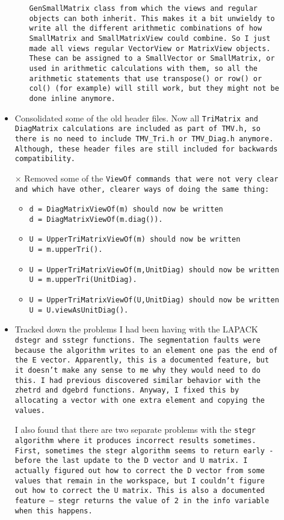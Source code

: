 \begin{description}
\begin{itemize}
\begin{itemize}
\tt{GenSmallMatrix} class from which the views and regular objects can both inherit.  This
makes it a bit unwieldy to write all the different arithmetic combinations of how 
\tt{SmallMatrix} and \tt{SmallMatrixView} could combine.  So I just made all views
regular \tt{VectorView} or \tt{MatrixView} objects.  These can be assigned to a \tt{SmallVector}
or \tt{SmallMatrix}, or used in arithmetic calculations with them, so all the arithmetic statements
that use \tt{transpose()} or \tt{row()} or \tt{col()} (for example) will still work, but they might
not be done inline anymore.
\end{itemize}
\item
Consolidated some of the old header files.  Now all \tt{TriMatrix} and \tt{DiagMatrix}
calculations are included as part of \tt{TMV.h}, so there is no need to include \tt{TMV\_Tri.h}
or \tt{TMV\_Diag.h} anymore.  Although, these header files are still included for backwards
compatibility.
\item[$\times$]
Removed some of the \tt{ViewOf} commands that were not very clear and
which have other, clearer ways of doing the same thing:
\begin{itemize}
\item
\tt{d = DiagMatrixViewOf(m)} should now be written\\
\tt{d = DiagMatrixViewOf(m.diag())}.
\item
\tt{U = UpperTriMatrixViewOf(m)} should now be written\\
\tt{U = m.upperTri()}.
\item
\tt{U = UpperTriMatrixViewOf(m,UnitDiag)} should now be written\\
\tt{U = m.upperTri(UnitDiag)}.
\item
\tt{U = UpperTriMatrixViewOf(U,UnitDiag)} should now be written\\
\tt{U = U.viewAsUnitDiag()}.
\end{itemize}
\item
Tracked down the problems I had been having with the LAPACK \tt{dstegr} and \tt{sstegr} 
functions.  The segmentation faults were because the algorithm writes to an element
one pas the end of the E vector.  Apparently, this is a documented feature, but it doesn't
make any sense to me why they would need to do this.  I had previous discovered similar
behavior with the \tt{zhetrd} and \tt{dgebrd} functions.  Anyway, I fixed this by allocating a
vector with one extra element and copying the values.

I also found that there are two separate problems with the \tt{stegr} algorithm where
it produces incorrect results sometimes.
First, sometimes the \tt{stegr} algorithm seems to return early - before the last update
to the D vector and U matrix.  I actually figured out how to correct the D vector from some 
values that remain in the workspace, but I couldn't figure out how to correct the U matrix.
This is also a documented feature -- \tt{stegr} returns the value of 2 in the \tt{info} variable 
when this happens.


\end{itemize}
\end{description}
